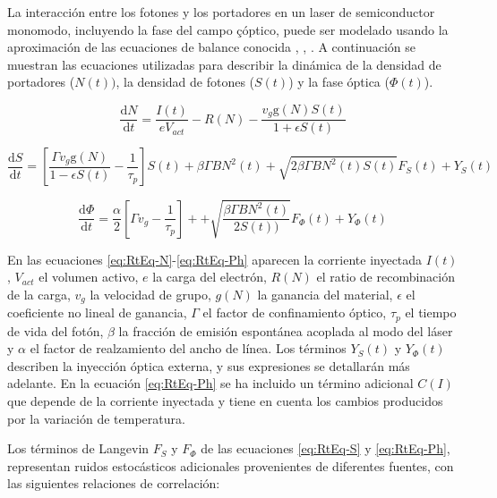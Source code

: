 La interacción entre los fotones y los portadores en un laser de semiconductor monomodo, incluyendo la fase del campo çóptico, puede ser modelado usando la aproximación de las ecuaciones de balance conocida \cite{artSim}, \cite{schunk1986noise}, \cite{fatadin2006numerical}. A continuación se muestran las ecuaciones utilizadas para describir la dinámica de la densidad de portadores ($N(t))$,  la densidad de fotones ($S(t)$) y la fase óptica ($\Phi(t)$).

	\begin{equation}
		\frac{\mathrm{d} N}{\mathrm{d} t} = \frac{I(t)}{e V_{act}} - R(N) - \frac{v_g \textrm{g}(N)S(t)}{1 + \epsilon S(t)} 
		\label{eq:RtEq-N}
	\end{equation}

	\begin{equation}
		\frac{\mathrm{d} S}{\mathrm{d} t} = \left[ \frac{\Gamma v_g \textrm{g}(N)}{1 - \epsilon S(t)} - \frac{1}{\tau_p} \right] S(t) + \beta \Gamma BN^2 (t) + \sqrt{2 \beta \Gamma B N^2(t)S(t)} F_S(t) + Y_S(t)
		\label{eq:RtEq-S}
	\end{equation}

	\begin{equation}
		\frac{\mathrm{d} \Phi}{\mathrm{d} t} = \frac{\alpha}{2}\left[ \Gamma v_g  - \frac{1}{\tau_p} \right] + + \sqrt{\frac{\beta \Gamma B N^2(t)}{2 S(t))}} F_{\Phi} (t) + Y_{\Phi}(t)
		\label{eq:RtEq-Ph}
	\end{equation}

	En las ecuaciones \ref{eq:RtEq-N}-\ref{eq:RtEq-Ph} aparecen la corriente inyectada $I(t)$, $V_{act}$ el volumen activo, $e$ la carga del electrón, $R(N)$ el ratio de recombinación de la carga, $v_g$ la velocidad de grupo, $g(N)$ la ganancia del material, $\epsilon$ el coeficiente no lineal de ganancia, $\Gamma$ el factor de confinamiento óptico, $\tau_p$ el tiempo de vida del fotón, $\beta$ la fracción de emisión espontánea acoplada al modo del láser y $\alpha$ el factor de realzamiento del ancho de línea. Los términos $Y_S(t)$ y $Y_{\Phi}(t)$ describen la inyección óptica externa, y sus expresiones se detallarán más adelante. En la ecuación \ref{eq:RtEq-Ph} se ha incluido un término adicional $C(I)$ que depende de la corriente inyectada y tiene en cuenta los cambios producidos por la variación de temperatura.

Los términos de Langevin $F_S$ y $F_{\Phi}$ de las ecuaciones \ref{eq:RtEq-S} y \ref{eq:RtEq-Ph}, representan ruidos estocásticos adicionales provenientes de diferentes fuentes, con las siguientes relaciones de correlación:

